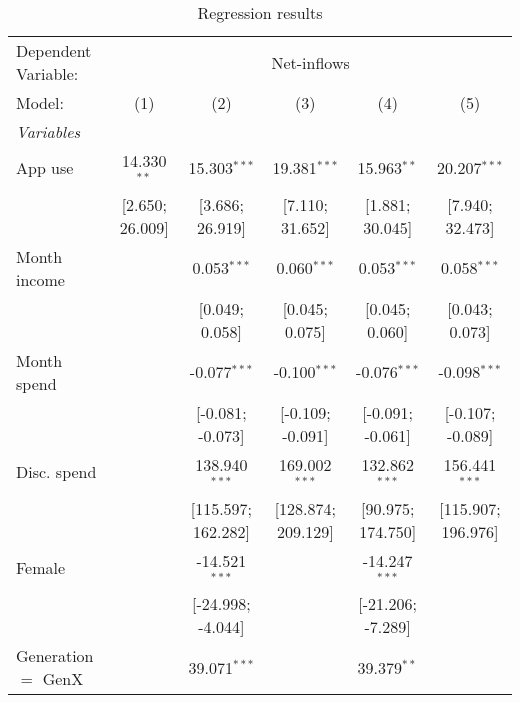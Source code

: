 
\begin{table}[htbp]
   \centering
   \tiny
   \begin{threeparttable}[b]
      \caption{\label{tab:reg_compare} Regression results}
      \begin{tabular}{lccccc}
         \tabularnewline \midrule \midrule
         Dependent Variable: & \multicolumn{5}{c}{Net-inflows}\\
         Model:                     & (1)                   & (2)                & (3)                & (4)               & (5)\\  
         \midrule
         \emph{Variables}\\
         App use                    & 14.330$^{**}$         & 15.303$^{***}$     & 19.381$^{***}$     & 15.963$^{**}$     & 20.207$^{***}$\\   
                                    & [2.650; 26.009]       & [3.686; 26.919]    & [7.110; 31.652]    & [1.881; 30.045]   & [7.940; 32.473]\\   
         Month income               &                       & 0.053$^{***}$      & 0.060$^{***}$      & 0.053$^{***}$     & 0.058$^{***}$\\   
                                    &                       & [0.049; 0.058]     & [0.045; 0.075]     & [0.045; 0.060]    & [0.043; 0.073]\\   
         Month spend                &                       & -0.077$^{***}$     & -0.100$^{***}$     & -0.076$^{***}$    & -0.098$^{***}$\\   
                                    &                       & [-0.081; -0.073]   & [-0.109; -0.091]   & [-0.091; -0.061]  & [-0.107; -0.089]\\   
         Disc. spend                &                       & 138.940$^{***}$    & 169.002$^{***}$    & 132.862$^{***}$   & 156.441$^{***}$\\   
                                    &                       & [115.597; 162.282] & [128.874; 209.129] & [90.975; 174.750] & [115.907; 196.976]\\   
         Female                     &                       & -14.521$^{***}$    &                    & -14.247$^{***}$   &   \\   
                                    &                       & [-24.998; -4.044]  &                    & [-21.206; -7.289] &   \\   
         Generation $=$ GenX        &                       & 39.071$^{***}$     &                    & 39.379$^{**}$     &   \\   

\end{tabular}
\end{threeparttable}
\end{table}
